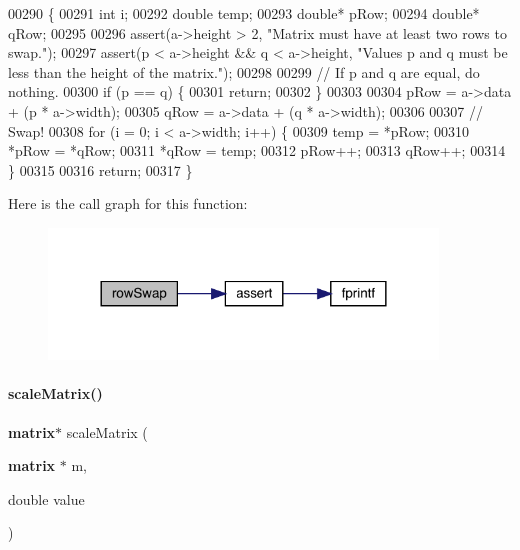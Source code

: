 \begin{DoxyCode}
00290                                       \{
00291     \textcolor{keywordtype}{int} i;
00292     \textcolor{keywordtype}{double} temp;
00293     \textcolor{keywordtype}{double}* pRow;
00294     \textcolor{keywordtype}{double}* qRow;
00295 
00296     assert(a->height > 2, \textcolor{stringliteral}{"Matrix must have at least two rows to swap."});
00297     assert(p < a->height && q < a->height, \textcolor{stringliteral}{"Values p and q must be less than the height of the matrix."});
00298 
00299     \textcolor{comment}{// If p and q are equal, do nothing.}
00300     \textcolor{keywordflow}{if} (p == q) \{
00301         \textcolor{keywordflow}{return};
00302     \}
00303 
00304     pRow = a->data + (p * a->width);
00305     qRow = a->data + (q * a->width);
00306 
00307     \textcolor{comment}{// Swap!}
00308     \textcolor{keywordflow}{for} (i = 0; i < a->width; i++) \{
00309         temp = *pRow;
00310         *pRow = *qRow;
00311         *qRow = temp;
00312         pRow++;
00313         qRow++;
00314     \}
00315 
00316     \textcolor{keywordflow}{return};
00317 \}
\end{DoxyCode}
Here is the call graph for this function\+:\nopagebreak
\begin{figure}[H]
\begin{center}
\leavevmode
\includegraphics[width=293pt]{matrix_8c_acdd57777a972ce339153878fa917db14_cgraph}
\end{center}
\end{figure}
\mbox{\label{matrix_8c_a6b7faa6ba9ee987d0777d9d0bd0e7b32}} 
\paragraph{scale\+Matrix()}
{\footnotesize\ttfamily \textbf{ matrix}$\ast$ scale\+Matrix (\begin{DoxyParamCaption}\item[{\textbf{ matrix} $\ast$}]{m,  }\item[{double}]{value }\end{DoxyParamCaption})}



